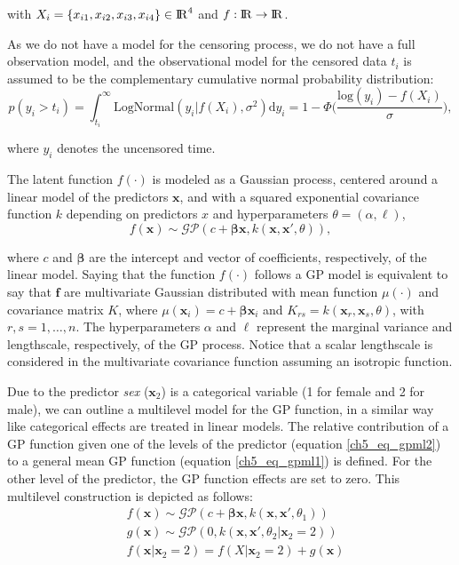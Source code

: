 \documentclass[onecolumn,a4paper,11pt]{article}
\begin{document}
\noindent with $X_i=\{x_{i1},x_{i2},x_{i3},x_{i4}\} \in {\rm I\!R}^4$ and $f:{\rm I\!R} \to {\rm I\!R}$.

As we do not have a model for the censoring process, we do not have a full observation model, and the observational model for the censored data $t_i$ is assumed to be the complementary cumulative normal probability distribution:
%
\begin{equation*}
p(y_i > t_i)= \int_{t_i}^{\infty} \mathrm{LogNormal}(y_i|f(X_i),\sigma^2) \mathrm{d}y_i=  1 - \Phi\! \Big( \frac{\mathrm{log}(y_i)-f(X_i)}{\sigma} \Big),
\end{equation*}

\noindent where $y_i$ denotes the uncensored time.

The latent function $f(\cdot)$ is modeled as a Gaussian process, centered around a linear model of the predictors $\bm{x}$, and with a squared exponential covariance function $k$ depending on predictors $x$ and hyperparameters $\theta=(\alpha,\ell)$,
%
\begin{equation*} 
f(\bm{x}) \sim \mathcal{GP}(c + \bm{\beta}\bm{x}, k(\bm{x},\bm{x}', \theta)),
\end{equation*}

\noindent where $c$ and $\bm{\beta}$ are the intercept and vector of coefficients, respectively, of the linear model.  Saying that the function $f(\cdot)$ follows a GP model is equivalent to say that $\bm{f}$ are multivariate Gaussian distributed with mean function $\mu(\cdot)$ and covariance matrix $K$, where $\mu(\bm{x}_i)=c + \bm{\beta}\bm{x}_i$ and $K_{rs}=k(\bm{x}_r,\bm{x}_s,\theta)$, with $r,s=1,\dots,n$.  The hyperparameters $\alpha$ and $\ell$ represent the marginal variance and lengthscale, respectively, of the GP process. Notice that a scalar lengthscale is considered in the multivariate covariance function assuming an isotropic function.


Due to the predictor \textit{sex} ($\bm{x}_2$) is a categorical variable (1 for female and 2 for male), we can outline a multilevel model for the GP function, in a similar way like categorical effects are treated in linear models. The relative contribution of a GP function given one of the levels of the predictor (equation \ref{ch5_eq_gpml2}) to a general mean GP function (equation \ref{ch5_eq_gpml1}) is defined. For the other level of the predictor, the GP function effects are set to zero. This multilevel construction is depicted as follows:
%
\begin{align} 
&f(\bm{x}) \sim \mathcal{GP}(c + \bm{\beta}\bm{x}, k(\bm{x},\bm{x}', \theta_1)) \label{ch5_eq_gpml1} \\
&g(\bm{x}) \sim \mathcal{GP}(0, k(\bm{x},\bm{x}', \theta_2|\bm{x}_2\!=\!2)) \label{ch5_eq_gpml2} \\ 
&f(\bm{x}|\bm{x}_2\!=\!2) = f(X|\bm{x}_2\!=\!2) + g(\bm{x}) \nonumber
\end{align}
\end{document}
